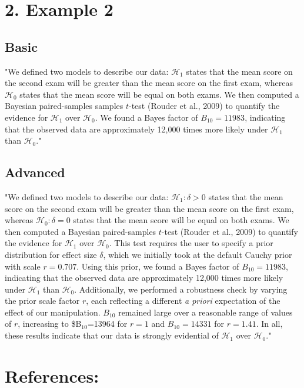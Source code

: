 \documentclass[11pt]{article}
\begin{document}
\section*{2. Example 2}
\label{sec:org73f3a59}
\subsection*{Basic}
\label{sec:org9cb60f2}
"We defined two models to describe our data: \(\mathcal{H}_1\) states that the mean score on the second exam will be greater than the mean score on the first exam, whereas \(\mathcal{H}_0\) states that the mean score will be equal on both exams. We then computed a Bayesian paired-samples samples \(t\)-test (Rouder et al., 2009) to quantify the evidence for \(\mathcal{H}_1\) over \(\mathcal{H}_0\).  We found a Bayes factor of \(B_{10}=11983\), indicating that the observed data are approximately 12,000 times more likely under \(\mathcal{H}_1\) than \(\mathcal{H}_0\)."

\subsection*{Advanced}
\label{sec:org9dc249b}
"We defined two models to describe our data: \(\mathcal{H}_1:\delta>0\) states that the mean score on the second exam will be greater than the mean score on the first exam, whereas \(\mathcal{H}_0:\delta=0\) states that the mean score will be equal on both exams. We then computed a Bayesian paired-samples \(t\)-test (Rouder et al., 2009) to quantify the evidence for \(\mathcal{H}_1\) over \(\mathcal{H}_0\). This test requires the user to specify a prior distribution for effect size \(\delta\), which we initially took at the default Cauchy prior with scale \(r=0.707\). Using this prior, we found a Bayes factor of \(B_{10}=11983\), indicating that the observed data are approximately 12,000 times more likely under \(\mathcal{H}_1\) than \(\mathcal{H}_0\).  Additionally, we performed a robustness check by varying the prior scale factor \(r\), each reflecting a different \emph{a priori} expectation of the effect of our manipulation. \(B_{10}\) remained large over a reasonable range of values of \(r\), increasing to \$B\(_{\text{10}}\)=13964 for \(r=1\) and \(B_{10}=14331\) for \(r=1.41\). In all, these results indicate that our data is strongly evidential of \(\mathcal{H}_1\) over \(\mathcal{H}_0\)."

\section*{References:}
\label{sec:org9954e51}
\end{document}
